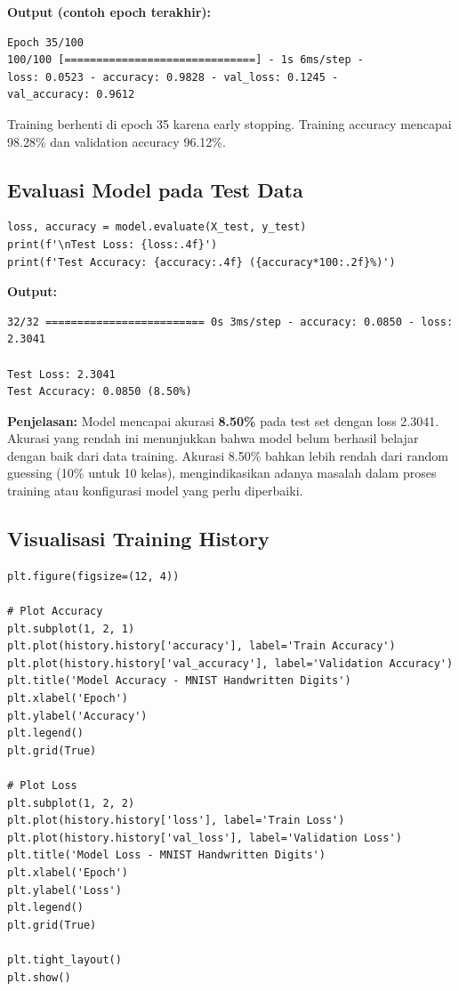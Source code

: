 \documentclass[12pt,a4paper]{article}
\begin{document}
\textbf{Output (contoh epoch terakhir):}
\begin{verbatim}
Epoch 35/100
100/100 [==============================] - 1s 6ms/step - 
loss: 0.0523 - accuracy: 0.9828 - val_loss: 0.1245 - 
val_accuracy: 0.9612
\end{verbatim}

Training berhenti di epoch 35 karena early stopping. Training accuracy mencapai 98.28\% dan validation accuracy 96.12\%.

\subsection{Evaluasi Model pada Test Data}

\begin{lstlisting}[caption=Evaluasi pada Test Set]
loss, accuracy = model.evaluate(X_test, y_test)
print(f'\nTest Loss: {loss:.4f}')
print(f'Test Accuracy: {accuracy:.4f} ({accuracy*100:.2f}%)')
\end{lstlisting}

\textbf{Output:}
\begin{verbatim}
32/32 ========================= 0s 3ms/step - accuracy: 0.0850 - loss: 2.3041

Test Loss: 2.3041
Test Accuracy: 0.0850 (8.50%)
\end{verbatim}

\textbf{Penjelasan:} Model mencapai akurasi \textbf{8.50\%} pada test set dengan loss 2.3041. Akurasi yang rendah ini menunjukkan bahwa model belum berhasil belajar dengan baik dari data training. Akurasi 8.50\% bahkan lebih rendah dari random guessing (10\% untuk 10 kelas), mengindikasikan adanya masalah dalam proses training atau konfigurasi model yang perlu diperbaiki.

\subsection{Visualisasi Training History}

\begin{lstlisting}[caption=Plot Accuracy dan Loss]
plt.figure(figsize=(12, 4))

# Plot Accuracy
plt.subplot(1, 2, 1)
plt.plot(history.history['accuracy'], label='Train Accuracy')
plt.plot(history.history['val_accuracy'], label='Validation Accuracy')
plt.title('Model Accuracy - MNIST Handwritten Digits')
plt.xlabel('Epoch')
plt.ylabel('Accuracy')
plt.legend()
plt.grid(True)

# Plot Loss
plt.subplot(1, 2, 2)
plt.plot(history.history['loss'], label='Train Loss')
plt.plot(history.history['val_loss'], label='Validation Loss')
plt.title('Model Loss - MNIST Handwritten Digits')
plt.xlabel('Epoch')
plt.ylabel('Loss')
plt.legend()
plt.grid(True)

plt.tight_layout()
plt.show()
\end{lstlisting}
\end{document}
